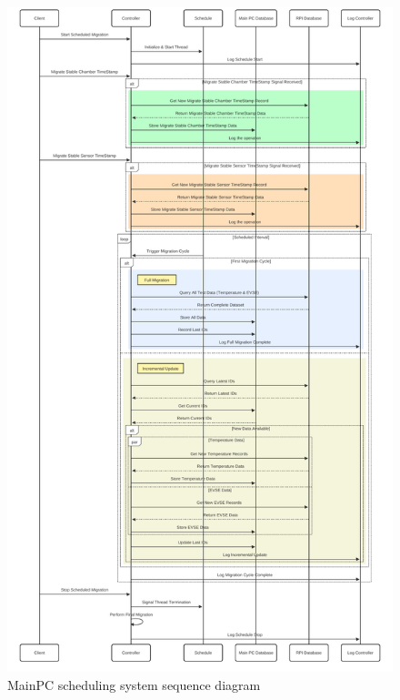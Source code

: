 \begin{figure}[H]
    \centering
    \begin{minipage}{0.48\textwidth}
        \centering
        \includegraphics[scale=0.10]{figures/scheduling_1.pdf}
        \caption{MainPC scheduling system sequence diagram}
        \label{fig:scheduling_1}
    \end{minipage}\hfill
    \begin{minipage}{0.48\textwidth}
        \centering

\end{minipage}
\end{figure}

